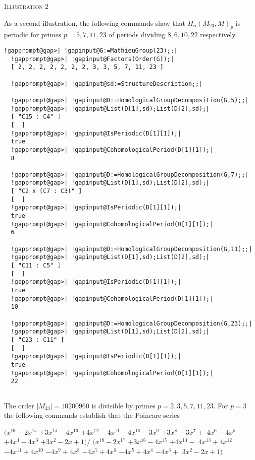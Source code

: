 \documentclass[a4paper,11pt]{report}
\begin{document}
{{\begin{Verbatim}[commandchars=!@|,fontsize=\small,frame=single,label=Example]
\end{Verbatim}
 

\textsc{Illustration 2} 

 As a second illustration, the following commands show that $H_n(M_{23},M)_{p}$ is periodic for primes $p=5, 7, 11, 23$ of periods dividing $8, 6, 10, 22$ respectively. 
\begin{Verbatim}[commandchars=!@|,fontsize=\small,frame=single,label=Example]
  !gapprompt@gap>| !gapinput@G:=MathieuGroup(23);;|
  !gapprompt@gap>| !gapinput@Factors(Order(G));|
  [ 2, 2, 2, 2, 2, 2, 2, 3, 3, 5, 7, 11, 23 ]
  
  !gapprompt@gap>| !gapinput@sd:=StructureDescription;;|
  
  !gapprompt@gap>| !gapinput@D:=HomologicalGroupDecomposition(G,5);;|
  !gapprompt@gap>| !gapinput@List(D[1],sd);List(D[2],sd);|
  [ "C15 : C4" ]
  [  ]
  !gapprompt@gap>| !gapinput@IsPeriodic(D[1][1]);|
  true
  !gapprompt@gap>| !gapinput@CohomologicalPeriod(D[1][1]);|
  8
  
  !gapprompt@gap>| !gapinput@D:=HomologicalGroupDecomposition(G,7);;|
  !gapprompt@gap>| !gapinput@List(D[1],sd);List(D[2],sd);|
  [ "C2 x (C7 : C3)" ]
  [  ]
  !gapprompt@gap>| !gapinput@IsPeriodic(D[1][1]);|
  true
  !gapprompt@gap>| !gapinput@CohomologicalPeriod(D[1][1]);|
  6
  
  !gapprompt@gap>| !gapinput@D:=HomologicalGroupDecomposition(G,11);;|
  !gapprompt@gap>| !gapinput@List(D[1],sd);List(D[2],sd);|
  [ "C11 : C5" ]
  [  ]
  !gapprompt@gap>| !gapinput@IsPeriodic(D[1][1]);|
  true
  !gapprompt@gap>| !gapinput@CohomologicalPeriod(D[1][1]);|
  10
  
  !gapprompt@gap>| !gapinput@D:=HomologicalGroupDecomposition(G,23);;|
  !gapprompt@gap>| !gapinput@List(D[1],sd);List(D[2],sd);|
  [ "C23 : C11" ]
  [  ]
  !gapprompt@gap>| !gapinput@IsPeriodic(D[1][1]);|
  true
  !gapprompt@gap>| !gapinput@CohomologicalPeriod(D[1][1]);|
  22
  
\end{Verbatim}
 

The order $|M_{23}|=10200960$ is divisible by primes $p=2, 3, 5, 7, 11, 23$. For $p=3$ the following commands establish that the Poincare series 

$(x^{16} - 2x^{15}$ $ + 3x^{14} - 4x^{13}$ $ + 4x^{12} - 4x^{11}$ $ + 4x^{10} - 3x^9$ $ + 3x^8 - 3x^7 +$ $ 4x^6 - 4x^5 $ $+ 4x^4 -4x^3$ $ + 3x^2 -2x + 1) /$ $ (x^{18} - 2x^{17}$ $ + 3x^{16} - 4x^{15}$ $ + 4x^{14} - $ $4x^{13} + 4x^{12}$ $ - 4x^{11} + 4x^{10}$ $ - 4x^9 + 4x^8$ $ - 4x^7 + 4x^6 $ $ - 4x^5 + 4x^4$ $ - 4x^3 +$ $ 3x^2 - 2x + 1)$ 

}}
\end{document}
